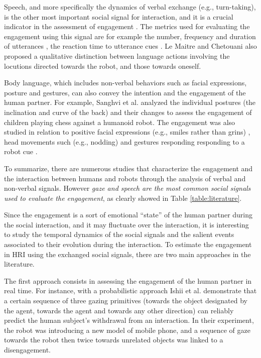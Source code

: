Speech, and more specifically the dynamics of verbal exchange (e.g., turn-taking), is the other most important social signal for interaction, and it is a crucial indicator in the assessment of engagement \cite{Lemaitre2013,rich2010recognizing}. The metrics used for evaluating the engagement using this signal are for example the number, frequency and duration of utterances \cite{Iishi2011,rich2010recognizing}, the reaction time to utterance cues \cite{ivaldi2014frontiers}. Le Maitre and Chetouani \cite{Lemaitre2013} also proposed a qualitative distinction between language actions involving the locutions directed towards the robot, and those towards oneself.


Body language, which includes non-verbal behaviors such as facial expressions, posture and gestures, can also convey the intention and the engagement of the human partner. 
For example, Sanghvi et al. \cite{Sanghvi2011} analyzed the individual postures (the inclination and curve of the back) and their changes to assess the engagement of children playing chess against a humanoid robot.
The engagement was also studied in relation to positive facial expressions (e.g., smiles rather than grins) \cite{Castellano2009}, head movements such (e.g., nodding) \cite{Sidner2006} and gestures responding responding to a robot cue \cite{rich2010recognizing}.


To summarize, there are numerous studies that characterize the engagement and the interaction between humans and robots through the analysis of verbal and non-verbal signals. However \emph{gaze and speech are the most common social signals used to evaluate the engagement}, as clearly showed in Table \ref{table:literature}.

Since the engagement is a sort of emotional ``state'' of the human partner during the social interaction, and it may fluctuate over the interaction, it is interesting to study the  temporal dynamics of the social signals and the salient events associated to their evolution during the interaction. 
To estimate the engagement in HRI using the exchanged social signals, there are two main approaches in the literature.

The first approach consists in assessing the engagement of the human partner in real time. For instance, with a probabilistic approach Ishii et al. \cite{Iishi2011} demonstrate that a certain sequence of three gazing primitives (towards the object designated by the agent, towards the agent and towards any other direction) can reliably predict the human subject's withdrawal from an interaction. 
In their experiment, the robot was introducing a new model of mobile phone, and a sequence of gaze towards the robot then twice towards unrelated objects was linked to a disengagement.
 

